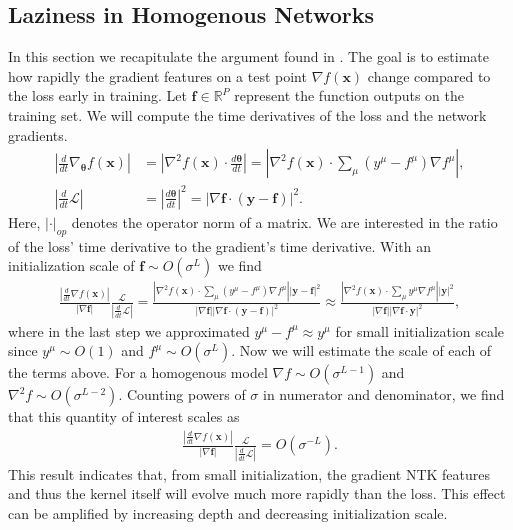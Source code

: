 \documentclass{article} %
\def\x{\bm x}
\begin{document}
\begin{appendix}
\section{Laziness in Homogenous Networks}\label{app:laziness}

In this section we recapitulate the argument found in  \cite{Chizat2019OnLT}. The goal is to estimate how rapidly the gradient features on a test point $\nabla f(\x)$ change compared to the loss early in training. Let $\bm f \in \mathbb{R}^P$ represent the function outputs on the training set. We will compute the time derivatives of the loss and the network gradients.
\begin{align}
    \left|\frac{d}{dt} \nabla_{\bm\theta} f(\x) \right| &= \left|\nabla^2 f(\x) \cdot \frac{d \bm\theta}{dt} \right| = \left| \nabla^2 f(\x) \cdot \sum_\mu (y^\mu  - f^\mu) \nabla f^\mu \right|   ,
    \\ \left|\frac{d}{dt} \mathcal L \right| &= \left|\frac{d \bm\theta}{dt} \right|^2 = \left|\nabla \bm f \cdot (\bm y - \bm f) \right|^2.
\end{align}
Here, $|\cdot |_{op}$ denotes the operator norm of a matrix.
We are interested in the ratio of the loss' time derivative to the gradient's time derivative. With an initialization scale of $\bm f \sim O(\sigma^L)$ we find
\begin{align}
    \frac{\left|\frac{d}{dt} \nabla f (\x) \right|}{|\nabla \bm f|} \frac{\mathcal L}{\left| \frac{d}{dt} \mathcal L \right|} = \frac{|\nabla^2 f(\x) \cdot \sum_\mu (y^\mu - f^\mu) \nabla f^\mu| |\bm y - \bm f|^2}{|\nabla \bm f| |\nabla \bm f \cdot (\bm y - \bm f)|^2} \approx \frac{|\nabla^2 f(\x) \cdot \sum_\mu y^\mu \nabla f^\mu| |\bm y|^2}{|\nabla \bm f| |\nabla \bm f \cdot \bm y|^2},
\end{align}
where in the last step we approximated $y^\mu - f^\mu \approx y^\mu$ for small initialization scale since $y^\mu \sim O(1)$ and $f^\mu \sim O(\sigma^L)$. Now we will estimate the scale of each of the terms above. For a homogenous model $\nabla f \sim O(\sigma^{L-1})$ and $\nabla^2 f \sim O(\sigma^{L-2})$. Counting powers of $\sigma$ in numerator and denominator, we find that this quantity of interest scales as
\begin{align}
    \frac{\left|\frac{d}{dt} \nabla f (\x) \right|}{|\nabla \bm f|} \frac{\mathcal L}{\left| \frac{d}{dt} \mathcal L \right|} = O(\sigma^{-L}).
\end{align}
This result indicates that, from small initialization, the gradient NTK features and thus the kernel itself will evolve much more rapidly than the loss. This effect can be amplified by increasing depth and decreasing initialization scale.
\end{appendix}
\end{document}
